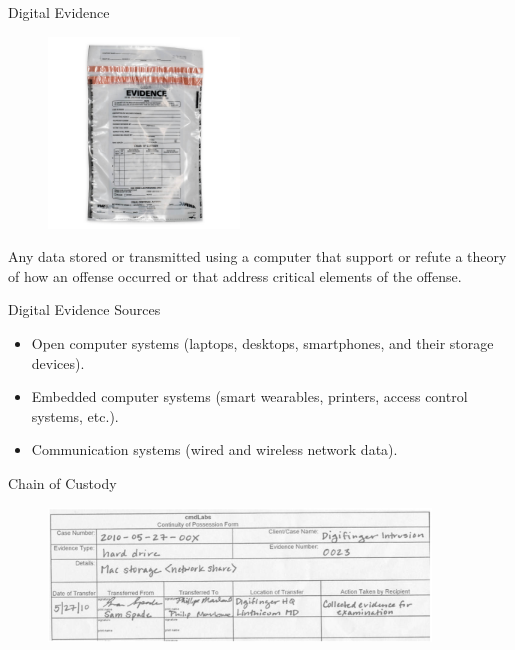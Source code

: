 \documentclass[handout]{beamer}
\begin{document}
\begin{frame}{Digital Evidence}

\begin{figure}
   \includegraphics[width=2in]{figures/digital-evidence.jpg}
\end{figure}

\pause
\footnotesize
Any data stored or transmitted using a computer that support or refute a theory of how an offense occurred or that address critical elements of the offense.


\end{frame}


\begin{frame}{Digital Evidence Sources}

\begin{itemize}
\footnotesize
\item Open computer systems (laptops, desktops, smartphones, and their storage devices).
\vspace{10pt}
\item Embedded computer systems (smart wearables, printers, access control systems, etc.).
\vspace{10pt}
\item Communication systems (wired and wireless network data).
\end{itemize}

\end{frame}



\begin{frame}{Chain of Custody}

\begin{figure}
   \includegraphics[width=4in]{figures/chain-of-custody-form.png}
\end{figure}

\end{frame}
\end{document}
